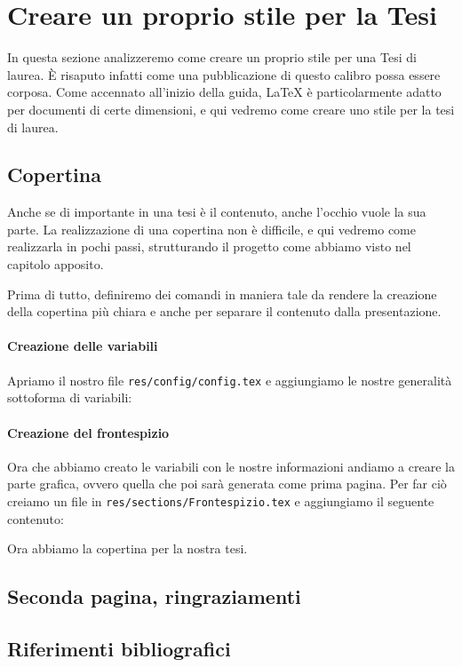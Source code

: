 \section{Creare un proprio stile per la Tesi}
In questa sezione analizzeremo come creare un proprio stile per una Tesi di
laurea. È risaputo infatti come una pubblicazione di questo calibro possa
essere corposa. Come accennato all'inizio della guida, \LaTeX{} è
particolarmente adatto per documenti di certe dimensioni, e qui vedremo come
creare uno stile per la tesi di laurea.

\subsection{Copertina}
Anche se di importante in una tesi è il contenuto, anche l'occhio vuole la sua
parte. La realizzazione di una copertina non è difficile, e qui vedremo come
realizzarla in pochi passi, strutturando il progetto come abbiamo visto nel
capitolo apposito. %

Prima di tutto, definiremo dei comandi in maniera tale da rendere la creazione
della copertina più chiara e anche per separare il contenuto dalla
presentazione.

\paragraph*{Creazione delle variabili} Apriamo il nostro file
\texttt{res/config/config.tex} e aggiungiamo le nostre generalità sottoforma di
variabili:



\paragraph*{Creazione del frontespizio} Ora che abbiamo creato le variabili con
le nostre informazioni andiamo a creare la parte grafica, ovvero quella che poi
sarà generata come prima pagina. Per far ciò creiamo un file in
\texttt{res/sections/Frontespizio.tex} e aggiungiamo il seguente contenuto:



\noindent Ora abbiamo la copertina per la nostra tesi.

\subsection{Seconda pagina, ringraziamenti}


\subsection{Riferimenti bibliografici}
